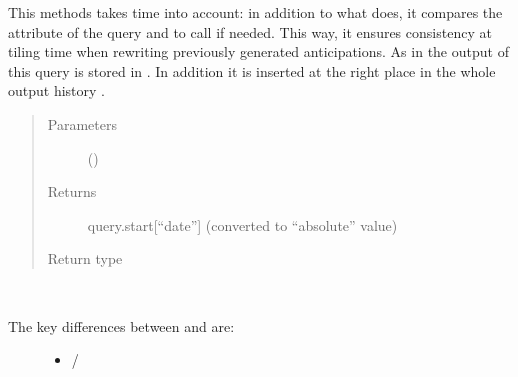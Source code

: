 \documentclass[letterpaper,10pt,english]{sphinxmanual}
\begin{document}
\begin{fulllineitems}
\begin{fulllineitems}
\begin{description}
\end{description}

This methods takes time into account: in addition to what {\hyperref[\detokenize{index:Generator.Generator.process_query}]{}} does, 
it compares the attribute  of the query and  to call  if needed.
This way, it ensures consistency at tiling time when rewriting previously generated anticipations.
As in {\hyperref[\detokenize{index:Generator.Generator.process_query}]{}} the output of this query is stored in . 
In addition it is inserted at the right place in the whole output history .
\begin{quote}\begin{description}
\item[{Parameters}] \leavevmode
{} ({\hyperref[\detokenize{index:Query.Query}]{}}) \textendash{} 

\item[{Returns}] \leavevmode
query.start{[}“date”{]} (converted to “absolute” value)

\item[{Return type}] \leavevmode
{}

\end{description}\end{quote}

\end{fulllineitems}


\begin{fulllineitems}
\label{\detokenize{index:Generator.GenerationHandler.receive_query}}~\begin{description}
\item[{The key differences between {\hyperref[\detokenize{index:Generator.Generator}]{}} and {\hyperref[\detokenize{index:Generator.GenerationHandler}]{}} are:}] \leavevmode\begin{itemize}
\item {} 
{\hyperref[\detokenize{index:Generator.Generator.receive_query}]{}} / {\hyperref[\detokenize{index:Generator.GenerationHandler.receive_query}]{}}


\end{itemize}
\end{description}
\end{fulllineitems}
\end{fulllineitems}
\end{document}
